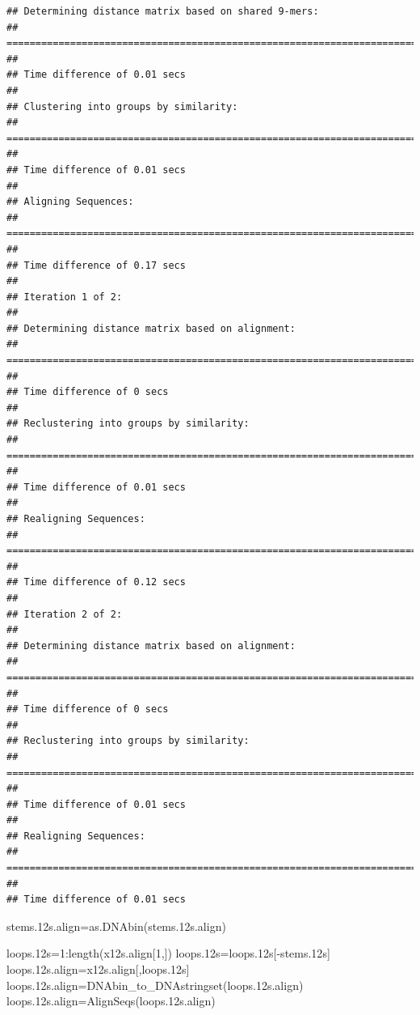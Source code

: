 \documentclass[
]{article}
\newenvironment{Shaded}{\begin{snugshade}}{\end{snugshade}}
\newcommand{\DecValTok}[1]{\textcolor[rgb]{0.00,0.00,0.81}{#1}}
\newcommand{\FloatTok}[1]{\textcolor[rgb]{0.00,0.00,0.81}{#1}}
\newcommand{\FunctionTok}[1]{\textcolor[rgb]{0.00,0.00,0.00}{#1}}
\newcommand{\NormalTok}[1]{#1}
\newcommand{\OtherTok}[1]{\textcolor[rgb]{0.56,0.35,0.01}{#1}}
\newcommand{\SpecialCharTok}[1]{\textcolor[rgb]{0.00,0.00,0.00}{#1}}
\begin{document}
\begin{verbatim}
## Determining distance matrix based on shared 9-mers:
## ================================================================================
## 
## Time difference of 0.01 secs
## 
## Clustering into groups by similarity:
## ================================================================================
## 
## Time difference of 0.01 secs
## 
## Aligning Sequences:
## ================================================================================
## 
## Time difference of 0.17 secs
## 
## Iteration 1 of 2:
## 
## Determining distance matrix based on alignment:
## ================================================================================
## 
## Time difference of 0 secs
## 
## Reclustering into groups by similarity:
## ================================================================================
## 
## Time difference of 0.01 secs
## 
## Realigning Sequences:
## ================================================================================
## 
## Time difference of 0.12 secs
## 
## Iteration 2 of 2:
## 
## Determining distance matrix based on alignment:
## ================================================================================
## 
## Time difference of 0 secs
## 
## Reclustering into groups by similarity:
## ================================================================================
## 
## Time difference of 0.01 secs
## 
## Realigning Sequences:
## ================================================================================
## 
## Time difference of 0.01 secs
\end{verbatim}

\begin{Shaded}
\begin{Highlighting}[]
\NormalTok{stems}\FloatTok{.12}\NormalTok{s.align}\OtherTok{=}\FunctionTok{as.DNAbin}\NormalTok{(stems}\FloatTok{.12}\NormalTok{s.align)}
\end{Highlighting}
\end{Shaded}

\begin{Shaded}
\begin{Highlighting}[]
\NormalTok{loops}\FloatTok{.12}\NormalTok{s}\OtherTok{=}\DecValTok{1}\SpecialCharTok{:}\FunctionTok{length}\NormalTok{(x12s.align[}\DecValTok{1}\NormalTok{,])}
\NormalTok{loops}\FloatTok{.12}\NormalTok{s}\OtherTok{=}\NormalTok{loops}\FloatTok{.12}\NormalTok{s[}\SpecialCharTok{{-}}\NormalTok{stems}\FloatTok{.12}\NormalTok{s]}
\NormalTok{loops}\FloatTok{.12}\NormalTok{s.align}\OtherTok{=}\NormalTok{x12s.align[,loops}\FloatTok{.12}\NormalTok{s]}
\NormalTok{loops}\FloatTok{.12}\NormalTok{s.align}\OtherTok{=}\FunctionTok{DNAbin\_to\_DNAstringset}\NormalTok{(loops}\FloatTok{.12}\NormalTok{s.align)}
\NormalTok{loops}\FloatTok{.12}\NormalTok{s.align}\OtherTok{=}\FunctionTok{AlignSeqs}\NormalTok{(loops}\FloatTok{.12}\NormalTok{s.align)}
\end{Highlighting}
\end{Shaded}
\end{document}
